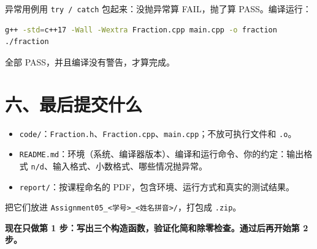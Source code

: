 \documentclass[11pt,a4paper]{article}
\newcommand{\code}[1]{\texttt{#1}}
\begin{document}
异常用例用 \code{try / catch} 包起来：没抛异常算 FAIL，抛了算 PASS。编译运行：

\begin{lstlisting}[language=bash]
g++ -std=c++17 -Wall -Wextra Fraction.cpp main.cpp -o fraction
./fraction
\end{lstlisting}

全部 PASS，并且编译没有警告，才算完成。

\section{六、最后提交什么}

\begin{itemize}
  \item \code{code/}：\code{Fraction.h}、\code{Fraction.cpp}、\code{main.cpp}；不放可执行文件和 \code{.o}。
  \item \code{README.md}：环境（系统、编译器版本）、编译和运行命令、你的约定：输出格式 \code{n/d}、输入格式、小数格式、哪些情况抛异常。
  \item \code{report/}：按课程命名的 PDF，包含环境、运行方式和真实的测试结果。
\end{itemize}

把它们放进 \code{Assignment05\_<学号>\_<姓名拼音>/}，打包成 \code{.zip}。

\bigskip
\begin{center}
\textbf{现在只做第 1 步：写出三个构造函数，验证化简和除零检查。通过后再开始第 2 步。}
\end{center}
\end{document}

